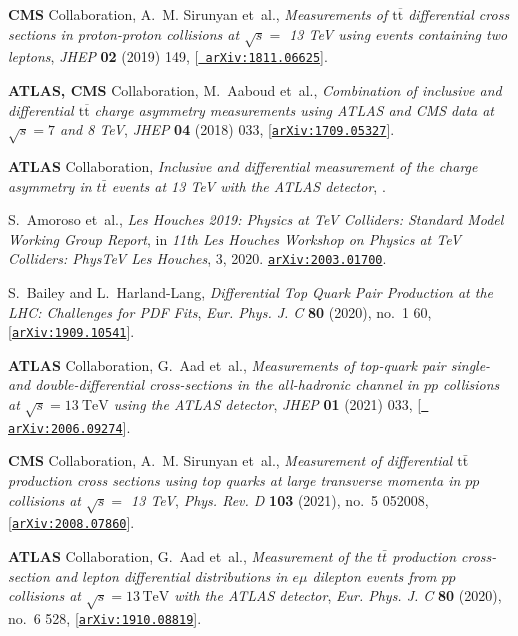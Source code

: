 \documentclass[11pt,a4paper]{article}
\numberwithin{equation}{section}
\numberwithin{figure}{section}
\numberwithin{table}{section}
\begin{document}
\begin{thebibliography}{100}
{\bf CMS} Collaboration, A.~M. Sirunyan et~al., {\it {Measurements of
  $\mathrm{t\overline{t}}$ differential cross sections in proton-proton
  collisions at $\sqrt{s}=$ 13 TeV using events containing two leptons}},  {\em
  JHEP} {\bf 02} (2019) 149, [\href{http://arxiv.org/abs/1811.06625}{{\tt
  arXiv:1811.06625}}].

{\bf ATLAS, CMS} Collaboration, M.~Aaboud et~al., {\it {Combination of
  inclusive and differential $ \mathrm{t}\overline{\mathrm{t}} $ charge
  asymmetry measurements using ATLAS and CMS data at $ \sqrt{s}=7 $ and 8
  TeV}},  {\em JHEP} {\bf 04} (2018) 033,
  [\href{http://arxiv.org/abs/1709.05327}{{\tt arXiv:1709.05327}}].

{\bf ATLAS} Collaboration, {\it {Inclusive and differential measurement of the
  charge asymmetry in $t\bar{t}$ events at 13 TeV with the ATLAS detector}}, .

S.~Amoroso et~al., {\it {Les Houches 2019: Physics at TeV Colliders: Standard
  Model Working Group Report}},  in {\em {11th Les Houches Workshop on Physics
  at TeV Colliders}: {PhysTeV Les Houches}}, 3, 2020.
\newblock \href{http://arxiv.org/abs/2003.01700}{{\tt arXiv:2003.01700}}.

S.~Bailey and L.~Harland-Lang, {\it {Differential Top Quark Pair Production at
  the LHC: Challenges for PDF Fits}},  {\em Eur. Phys. J. C} {\bf 80} (2020),
  no.~1 60, [\href{http://arxiv.org/abs/1909.10541}{{\tt arXiv:1909.10541}}].

{\bf ATLAS} Collaboration, G.~Aad et~al., {\it {Measurements of top-quark pair
  single- and double-differential cross-sections in the all-hadronic channel in
  $pp$ collisions at $\sqrt{s}=13~\textrm{TeV}$ using the ATLAS detector}},
  {\em JHEP} {\bf 01} (2021) 033, [\href{http://arxiv.org/abs/2006.09274}{{\tt
  arXiv:2006.09274}}].

{\bf CMS} Collaboration, A.~M. Sirunyan et~al., {\it {Measurement of
  differential $\mathrm{t\bar{t}}$ production cross sections using top quarks
  at large transverse momenta in $pp$ collisions at $\sqrt{s} =$ 13 TeV}},
  {\em Phys. Rev. D} {\bf 103} (2021), no.~5 052008,
  [\href{http://arxiv.org/abs/2008.07860}{{\tt arXiv:2008.07860}}].

{\bf ATLAS} Collaboration, G.~Aad et~al., {\it {Measurement of the $t\bar{t}$
  production cross-section and lepton differential distributions in $e\mu $
  dilepton events from $pp$ collisions at $\sqrt{s}=13\,\text {TeV}$ with the
  ATLAS detector}},  {\em Eur. Phys. J. C} {\bf 80} (2020), no.~6 528,
  [\href{http://arxiv.org/abs/1910.08819}{{\tt arXiv:1910.08819}}].


\end{thebibliography}
\end{document}
